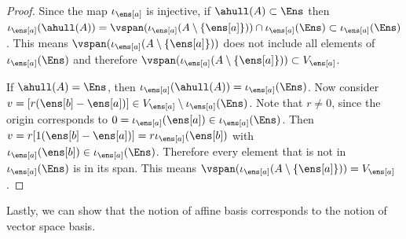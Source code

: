 \begin{mathSection}
\begin{proof}
	Since the map $\iota_{\ens[a]}$ is injective, if $\ahull(A) \subset \Ens$ then $\iota_{\ens[a]}(\ahull(A)) = \vspan(\iota_{\ens[a]}(A \setminus \{\ens[a]\})) \cap \iota_{\ens[a]}(\Ens) \subset \iota_{\ens[a]}(\Ens)$. This means $\vspan(\iota_{\ens[a]}(A \setminus \{\ens[a]\}))$ does not include all elements of $\iota_{\ens[a]}(\Ens)$ and therefore $\vspan(\iota_{\ens[a]}(A \setminus \{\ens[a]\})) \subset V_{\ens[a]}$.
	
	If $\ahull(A) = \Ens$, then $\iota_{\ens[a]}(\ahull(A)) = \iota_{\ens[a]}(\Ens)$. Now consider $v = [r(\ens[b] - \ens[a])] \in V_{\ens[a]} \setminus \iota_{\ens[a]}(\Ens)$. Note that $r \neq 0$, since the origin corresponds to $0 = \iota_{\ens[a]}(\ens[a]) \in \iota_{\ens[a]}(\Ens)$. Then $ v = r [1(\ens[b] - \ens[a])] = r \iota_{\ens[a]}(\ens[b])$ with $\iota_{\ens[a]}(\ens[b]) \in \iota_{\ens[a]}(\Ens)$. Therefore every element that is not in $\iota_{\ens[a]}(\Ens)$ is in its span. This means $\vspan(\iota_{\ens[a]}(A\setminus\{\ens[a]\})) = V_{\ens[a]}$.
\end{proof}
\end{mathSection}

Lastly, we can show that the notion of affine basis corresponds to the notion of vector space basis.

